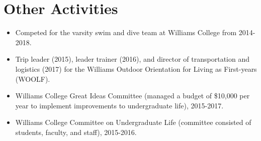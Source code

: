 \documentclass[margin, 10pt]{res} %
\begin{document}
\begin{resume}
{\begin{itemize}
   \end{itemize}
   
 \section{Other Activities}
\begin{itemize}
\item Competed for the varsity swim and dive team at Williams College from 2014-2018. %
\item Trip leader (2015), leader trainer (2016), and director of transportation and logistics (2017) for the Williams Outdoor Orientation for Living as First-years (WOOLF). 
  \item Williams College Great Ideas Committee (managed a budget of \$10,000 per year to implement improvements to undergraduate life), 2015-2017.
 \item Williams College Committee on Undergraduate Life (committee consisted of students, faculty, and staff), 2015-2016.

\end{itemize}




}
\end{resume}
\end{document}
